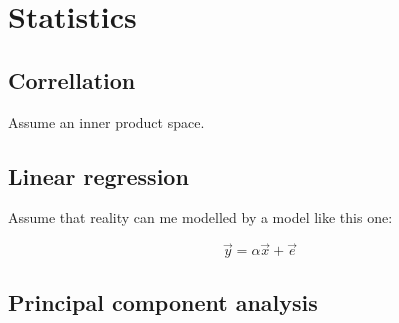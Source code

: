 \section{Statistics}

\subsection{Correllation}
Assume an inner product space.

\subsection{Linear regression}

Assume that reality can me modelled by a model like this one: 

$$ \vec{y} = \alpha \vec{x} + \vec{e} $$

\subsection{Principal component analysis}